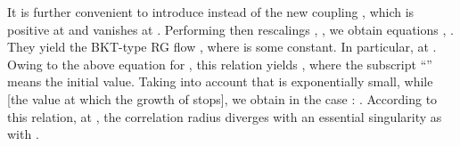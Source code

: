 \documentclass[a4paper,12pt]{article}
\begin{document}
It is further convenient to introduce instead of \coordHE{} the new coupling \coordHE{}, which is positive at \coordHE{} and
vanishes at \coordHE{}. Performing then rescalings \coordHE{}, \coordHE{}, we obtain
equations \coordHE{}, \coordHE{}. They yield the BKT-type RG flow \coordHE{}, where
\coordHE{} is some constant.
In particular, \coordHE{} at \coordHE{}. Owing to the above equation for \coordHE{}, this relation yields
\coordHE{}, where the subscript ``\coordHE{}''
means the initial value.
Taking into account that \coordHE{} is exponentially small, while
\coordHE{} [the value at which the growth of \coordHE{} stops], we obtain in the case \coordHE{}:
\coordHE{}. According to this relation,
at \coordHE{}, the correlation radius diverges with an essential singularity as
\coordHE{} with \coordHE{}.
\end{document}
